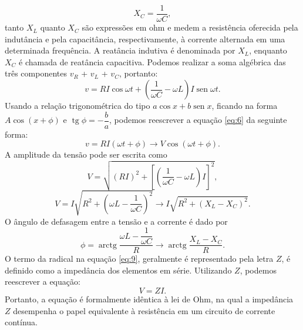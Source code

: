 \begin{equation}
    X_C = \frac{1}{\omega C},
    \label{eq:5}
\end{equation}
tanto $X_{L}$ quanto $X_{C}$ são expressões em ohm e medem a resistência oferecida pela indutância e pela capacitância, respectivamente, à corrente alternada em uma determinada frequência. A reatância indutiva é denominada por $X_{L}$, enquanto $X_{C}$ é chamada de reatância capacitiva. Podemos realizar a soma algébrica das três componentes $v_{R}$ + $v_{L}$ + $v_{C}$, portanto:
\begin{equation}
    v = RI\cos\omega t + \left(\frac{1}{\omega C} - \omega L\right) I \operatorname{sen} \omega t.
    \label{eq:6}
\end{equation}
Usando a relação trigonométrica do tipo $a \cos x + b \operatorname{sen} x$, ficando na forma $A\cos(x + \phi)$ e $\operatorname{tg}\phi = -\dfrac{b}{a}$, podemos reescrever a equação \eqref{eq:6} da seguinte forma:
\begin{equation}
    v = RI(\omega t + \phi) \rightarrow V\cos(\omega t + \phi).
    \label{eq:7}
\end{equation}
A amplitude da tensão pode ser escrita como
\begin{equation}
    V = \sqrt{(RI)^2 + \left[\left(\frac{1}{\omega C} - \omega L\right) I\right]^2},
    \label{eq:8}
\end{equation}
\begin{equation}
V = I\sqrt{R^2 + \left(\omega L - \frac{1}{\omega C}\right)^2} \rightarrow I\sqrt{R^2 + (X_L - X_C)^2}.
    \label{eq:9}
\end{equation}
O ângulo de defasagem entre a tensão e a corrente é dado por
\begin{equation}
    \phi = \operatorname{arctg}\frac{\omega L - \dfrac{1}{\omega C}}{R} \rightarrow \operatorname{arctg}\frac{X_L - X_C}{R}.
    \label{eq:10}
\end{equation}
O termo da radical na equação \eqref{eq:9}, geralmente é representado pela letra $Z$, é definido como a impedância dos elementos em série. Utilizando $Z$, podemos reescrever a equação:
\begin{equation}
    V = ZI.
    \label{eq:11}
\end{equation}
 Portanto, a equação é formalmente idêntica à lei de Ohm, na qual a impedância $Z$ desempenha o papel
equivalente à resistência em um circuito de corrente contínua.

